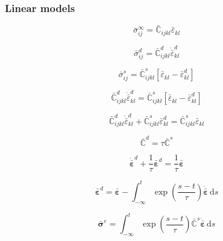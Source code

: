 \documentclass[12pt]{article}
\renewcommand{\d}{\text{d}}
\begin{document}
\subsubsection{Linear models}
\begin{equation}
	\bar{\sigma}_{ij}^{\infty}= \bar{\mathbb{C}}_{ijkl} \bar{\varepsilon}_{kl}
\end{equation}

\begin{equation}
	\bar{\sigma}_{ij}^{d} = \bar{\mathbb{C}}^{d}_{ijkl} \dot{\bar{\varepsilon}}^{d}_{kl}
\end{equation}

\begin{equation}
\bar{\sigma}_{ij}^{s} = \bar{\mathbb{C}}^{s}_{ijkl} \left[\bar{\varepsilon}_{kl}-\bar{\varepsilon}^{d}_{kl}\right]
\end{equation}

\begin{equation}
	\bar{\mathbb{C}}^{d}_{ijkl} \dot{\bar{\varepsilon}}^{d}_{kl} = \bar{\mathbb{C}}^{s}_{ijkl} \left[\bar{\varepsilon}_{kl}-\bar{\varepsilon}^{d}_{kl}\right]
\end{equation}

\begin{equation}
\bar{\mathbb{C}}^{d}_{ijkl} \dot{\bar{\varepsilon}}^{d}_{kl} + \bar{\mathbb{C}}^{s}_{ijkl}\bar{\varepsilon}^{d}_{kl} = \bar{\mathbb{C}}^{s}_{ijkl} \bar{\varepsilon}_{kl}
\end{equation}

\begin{equation}
	\bar{\mathbb{C}}^{d} = \tau\bar{\mathbb{C}}^{s}
\end{equation}

\begin{equation}
\dot{\bar{\bm{\varepsilon}}}^{d} + \dfrac{1}{\tau}\bar{\bm{\varepsilon}}^{d} = \dfrac{1}{\tau} \bar{\bm{\varepsilon}}
\end{equation}


\begin{equation}
\bar{\bm{\varepsilon}}^{d} = \bar{\bm{\varepsilon}} - \int_{-\infty}^{t} \exp\left(\dfrac{s-t}{\tau}\right)\dot{\bar{\bm{\varepsilon}}} \,\d s
\end{equation}

\begin{equation}
\bar{\bm{\sigma}}^{e} = \int_{-\infty}^{t} \exp\left(\dfrac{s-t}{\tau}\right)\bar{\mathbb{C}}^{s}\dot{\bar{\bm{\varepsilon}}} \,\d s
\end{equation}
\end{document}
